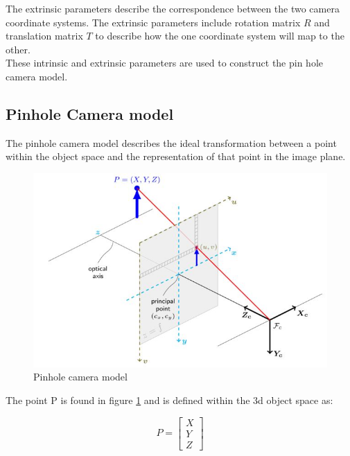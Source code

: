The extrinsic parameters describe the correspondence between the two camera coordinate systems. The extrinsic parameters include rotation matrix $R$ and translation matrix $T$ to describe how the one coordinate system will map to the other.\\

These intrinsic and extrinsic parameters are used to construct the pin hole camera model.

\subsection{Pinhole Camera model}
\label{sec:pinhole}

The pinhole camera model describes the ideal transformation between a point within the object space and the representation of that point in the image plane. 


\begin{figure}[H]
\centering
\includegraphics[scale=0.75]{images/pinhole_model.JPG}
\caption{Pinhole camera model \cite{calib3d}}
\label{fig:pinhole_model}	
\end{figure}

The point P is found in figure \ref{fig:pinhole_model} and is defined within the 3d object space as:

\begin{equation}\label{eq:principleP}
P =  \begin{bmatrix}{X}\\{Y}\\{Z}\end{bmatrix}
\end{equation}

